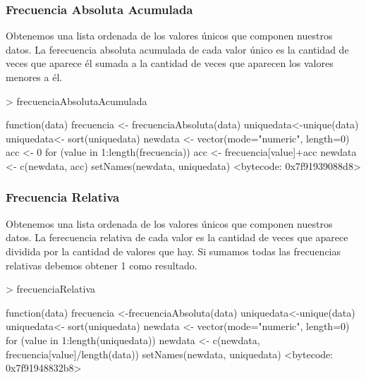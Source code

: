 \documentclass [a4paper] {article}
\begin{document}
\subsubsection{Frecuencia Absoluta Acumulada}
Obtenemos una lista ordenada de los valores únicos que componen nuestros datos.
La ferecuencia absoluta acumulada de cada valor único es la cantidad de veces que aparece él sumada a la cantidad de veces que aparecen los valores menores a él.
\begin{Schunk}
\begin{Sinput}
> frecuenciaAbsolutaAcumulada
\end{Sinput}
\begin{Soutput}
function(data){
    frecuencia <- frecuenciaAbsoluta(data)
    uniquedata<-unique(data)
    uniquedata<- sort(uniquedata)
    newdata <- vector(mode="numeric", length=0)
    acc <- 0
    for (value in 1:length(frecuencia)) {
        acc <- frecuencia[value]+acc
        newdata <- c(newdata, acc)
    }
    setNames(newdata, uniquedata)
}
<bytecode: 0x7f91939088d8>
\end{Soutput}
\end{Schunk}
\subsubsection{Frecuencia Relativa}
Obtenemos una lista ordenada de los valores únicos que componen nuestros datos.
La ferecuencia relativa de cada valor es la cantidad de veces que aparece dividida por la cantidad de valores que hay.
Si sumamos todas las frecuencias relativas debemos obtener 1 como resultado.
\begin{Schunk}
\begin{Sinput}
> frecuenciaRelativa
\end{Sinput}
\begin{Soutput}
function(data){
  frecuencia <-frecuenciaAbsoluta(data)
  uniquedata<-unique(data)
  uniquedata<- sort(uniquedata)
  newdata <- vector(mode="numeric", length=0)
  for (value in 1:length(uniquedata)) {
    newdata <- c(newdata, frecuencia[value]/length(data))
  }
  setNames(newdata, uniquedata)
}
<bytecode: 0x7f91948832b8>
\end{Soutput}
\end{Schunk}
\end{document}
